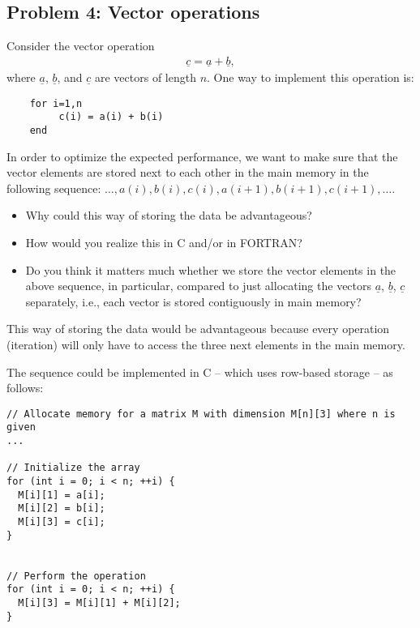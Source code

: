 \subsection{Problem 4: Vector operations} %
\label{sec:exercise_4_vector_operations}
\begin{question}
  Consider the vector operation
\begin{align*}
\underline{c} = \underline{a} + \underline{b},
\end{align*}
where $\underline{a}$, $\underline{b}$, and $\underline{c}$
are vectors of length $n$. One way to implement this operation is:
\begin{verbatim}
    for i=1,n
         c(i) = a(i) + b(i)
    end
\end{verbatim}

\noindent In order to optimize the expected performance, we want to make sure that the vector elements are stored next to each other in the main memory in the following sequence: $\ldots, a(i), b(i), c(i), a(i+1), b(i+1), c(i+1), \ldots$.
\begin{itemize}
\item Why could this way of storing the data be advantageous?
\item How would you realize this in C and/or in FORTRAN?
\item Do you think it matters much whether we store the vector elements
in the above sequence, in particular, compared to just allocating the vectors
$\underline{a}$, $\underline{b}$, $\underline{c}$ separately,
i.e., each vector is stored contiguously in main memory?
\end{itemize}
\end{question}

\noindent This way of storing the data would be advantageous because every operation (iteration) will only have to access the three next elements in the main memory.

The sequence could be implemented in C -- which uses row-based storage -- as follows:

\begin{lstlisting}
// Allocate memory for a matrix M with dimension M[n][3] where n is given
...

// Initialize the array
for (int i = 0; i < n; ++i) {
  M[i][1] = a[i];
  M[i][2] = b[i];
  M[i][3] = c[i];
}


// Perform the operation
for (int i = 0; i < n; ++i) {
  M[i][3] = M[i][1] + M[i][2];
}
\end{lstlisting}


